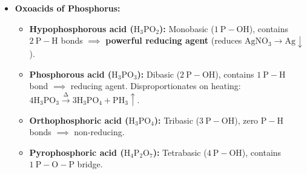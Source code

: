 \documentclass[10pt,a4paper]{article}
\begin{document}
\begin{itemize}
\begin{align}
    \text{Zinc with Dilute } \mathrm{HNO_3} &: 4\mathrm{Zn} + 10\mathrm{HNO_3(dil)} \longrightarrow 4\mathrm{Zn(NO_3)_2} + \mathbf{\mathrm{N_2O\uparrow}} + 5\mathrm{H_2O} \\
    \text{Zinc with Conc. } \mathrm{HNO_3} &: \mathrm{Zn} + 4\mathrm{HNO_3(conc)} \longrightarrow \mathrm{Zn(NO_3)_2} + \mathbf{2\mathrm{NO_2\uparrow}} + 2\mathrm{H_2O}
  \end{align}
  Passive metals ($\mathrm{Fe, Cr, Al}$) do not dissolve in concentrated $\mathrm{HNO_3}$ due to formation of an impervious surface oxide film.
  \item \textbf{Oxoacids of Phosphorus:}
  \begin{itemize}
    \item \textbf{Hypophosphorous acid ($\mathrm{H_3PO_2}$):} Monobasic ($1\ \mathrm{P-OH}$), contains $2\ \mathrm{P-H}$ bonds $\implies$ \textbf{powerful reducing agent} (reduces $\mathrm{AgNO_3 \to Ag\downarrow}$).
    \item \textbf{Phosphorous acid ($\mathrm{H_3PO_3}$):} Dibasic ($2\ \mathrm{P-OH}$), contains $1\ \mathrm{P-H}$ bond $\implies$ reducing agent. Disproportionates on heating: $4\mathrm{H_3PO_3 \xrightarrow{\Delta} 3H_3PO_4 + PH_3\uparrow}$.
    \item \textbf{Orthophosphoric acid ($\mathrm{H_3PO_4}$):} Tribasic ($3\ \mathrm{P-OH}$), zero $\mathrm{P-H}$ bonds $\implies$ non-reducing.
    \item \textbf{Pyrophosphoric acid ($\mathrm{H_4P_2O_7}$):} Tetrabasic ($4\ \mathrm{P-OH}$), contains $1\ \mathrm{P-O-P}$ bridge.
  \end{itemize}
\end{itemize}
\end{document}
